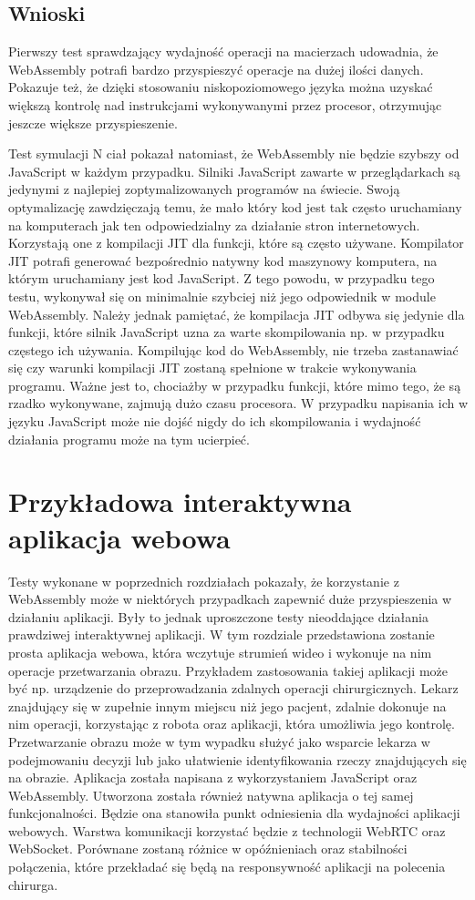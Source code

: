 \documentclass[language=polish,type=master]{aghmodern}
\begin{document}
\section{Wnioski}
Pierwszy test sprawdzający wydajność operacji na macierzach udowadnia, że WebAssembly potrafi bardzo przyspieszyć operacje na dużej ilości danych.
Pokazuje też, że dzięki stosowaniu niskopoziomowego języka można uzyskać większą kontrolę nad instrukcjami wykonywanymi przez procesor, otrzymując jeszcze większe przyspieszenie.

Test symulacji N ciał pokazał natomiast, że WebAssembly nie będzie szybszy od JavaScript w każdym przypadku.
Silniki JavaScript zawarte w przeglądarkach są jedynymi z najlepiej zoptymalizowanych programów na świecie.
Swoją optymalizację zawdzięczają temu, że mało który kod jest tak często uruchamiany na komputerach jak ten odpowiedzialny za działanie stron internetowych.
Korzystają one z kompilacji JIT dla funkcji, które są często używane.
Kompilator JIT potrafi generować bezpośrednio natywny kod maszynowy komputera, na którym uruchamiany jest kod JavaScript.
Z tego powodu, w przypadku tego testu, wykonywał się on minimalnie szybciej niż jego odpowiednik w module WebAssembly.
Należy jednak pamiętać, że kompilacja JIT odbywa się jedynie dla funkcji, które silnik JavaScript uzna za warte skompilowania np. w przypadku częstego ich używania.
Kompilując kod do WebAssembly, nie trzeba zastanawiać się czy warunki kompilacji JIT zostaną spełnione w trakcie wykonywania programu.
Ważne jest to, chociażby w przypadku funkcji, które mimo tego, że są rzadko wykonywane, zajmują dużo czasu procesora.
W przypadku napisania ich w języku JavaScript może nie dojść nigdy do ich skompilowania i wydajność działania programu może na tym ucierpieć.

\chapter{Przykładowa interaktywna aplikacja webowa}
Testy wykonane w poprzednich rozdziałach pokazały, że korzystanie z WebAssembly może w niektórych przypadkach zapewnić duże przyspieszenia w działaniu aplikacji.
Były to jednak uproszczone testy nieoddające działania prawdziwej interaktywnej aplikacji.
W tym rozdziale przedstawiona zostanie prosta aplikacja webowa, która wczytuje strumień wideo i wykonuje na nim operacje przetwarzania obrazu.
Przykładem zastosowania takiej aplikacji może być np. urządzenie do przeprowadzania zdalnych operacji chirurgicznych.
Lekarz znajdujący się w zupełnie innym miejscu niż jego pacjent, zdalnie dokonuje na nim operacji, korzystając z robota oraz aplikacji, która umożliwia jego kontrolę.
Przetwarzanie obrazu może w tym wypadku służyć jako wsparcie lekarza w podejmowaniu decyzji lub jako ułatwienie identyfikowania rzeczy znajdujących się na obrazie.
Aplikacja została napisana z wykorzystaniem JavaScript oraz WebAssembly.
Utworzona została również natywna aplikacja o tej samej funkcjonalności.
Będzie ona stanowiła punkt odniesienia dla wydajności aplikacji webowych.
Warstwa komunikacji korzystać będzie z technologii WebRTC oraz WebSocket.
Porównane zostaną różnice w opóźnieniach oraz stabilności połączenia, które przekładać się będą na responsywność aplikacji na polecenia chirurga.
\end{document}
